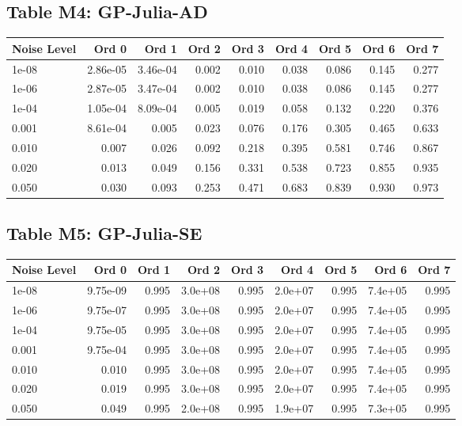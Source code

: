 \documentclass[10pt]{article}
\begin{document}
\clearpage

\subsection*{Table M4: GP-Julia-AD}

\begin{longtable}{lrrrrrrrr}
\toprule
\textbf{Noise Level} & \textbf{Ord 0} & \textbf{Ord 1} & \textbf{Ord 2} & \textbf{Ord 3} & \textbf{Ord 4} & \textbf{Ord 5} & \textbf{Ord 6} & \textbf{Ord 7} \\
\midrule
\endhead
1e-08 & 2.86e-05 & 3.46e-04 & 0.002 & 0.010 & 0.038 & 0.086 & 0.145 & 0.277 \\
1e-06 & 2.87e-05 & 3.47e-04 & 0.002 & 0.010 & 0.038 & 0.086 & 0.145 & 0.277 \\
1e-04 & 1.05e-04 & 8.09e-04 & 0.005 & 0.019 & 0.058 & 0.132 & 0.220 & 0.376 \\
0.001 & 8.61e-04 & 0.005 & 0.023 & 0.076 & 0.176 & 0.305 & 0.465 & 0.633 \\
0.010 & 0.007 & 0.026 & 0.092 & 0.218 & 0.395 & 0.581 & 0.746 & 0.867 \\
0.020 & 0.013 & 0.049 & 0.156 & 0.331 & 0.538 & 0.723 & 0.855 & 0.935 \\
0.050 & 0.030 & 0.093 & 0.253 & 0.471 & 0.683 & 0.839 & 0.930 & 0.973 \\
\bottomrule
\end{longtable}

\clearpage

\subsection*{Table M5: GP-Julia-SE}

\begin{longtable}{lrrrrrrrr}
\toprule
\textbf{Noise Level} & \textbf{Ord 0} & \textbf{Ord 1} & \textbf{Ord 2} & \textbf{Ord 3} & \textbf{Ord 4} & \textbf{Ord 5} & \textbf{Ord 6} & \textbf{Ord 7} \\
\midrule
\endhead
1e-08 & 9.75e-09 & 0.995 & 3.0e+08 & 0.995 & 2.0e+07 & 0.995 & 7.4e+05 & 0.995 \\
1e-06 & 9.75e-07 & 0.995 & 3.0e+08 & 0.995 & 2.0e+07 & 0.995 & 7.4e+05 & 0.995 \\
1e-04 & 9.75e-05 & 0.995 & 3.0e+08 & 0.995 & 2.0e+07 & 0.995 & 7.4e+05 & 0.995 \\
0.001 & 9.75e-04 & 0.995 & 3.0e+08 & 0.995 & 2.0e+07 & 0.995 & 7.4e+05 & 0.995 \\
0.010 & 0.010 & 0.995 & 3.0e+08 & 0.995 & 2.0e+07 & 0.995 & 7.4e+05 & 0.995 \\
0.020 & 0.019 & 0.995 & 3.0e+08 & 0.995 & 2.0e+07 & 0.995 & 7.4e+05 & 0.995 \\
0.050 & 0.049 & 0.995 & 2.0e+08 & 0.995 & 1.9e+07 & 0.995 & 7.3e+05 & 0.995 \\
\bottomrule
\end{longtable}
\end{document}
